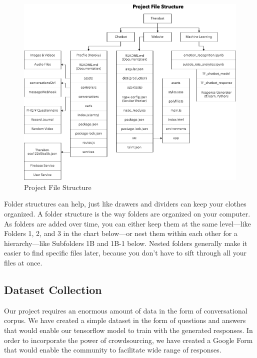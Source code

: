 \begin{figure}[H]
    \centering
    \includegraphics[width=12cm]{images/project-file-structure.png}
    \caption{Project File Structure}
\end{figure}

Folder structures can help, just like drawers and dividers can keep your clothes organized. A folder structure is the way folders are organized on your computer. As folders are added over time, you can either keep them at the same level—like Folders 1, 2, and 3 in the chart below—or nest them within each other for a hierarchy—like Subfolders 1B and 1B-1 below. Nested folders generally make it easier to find specific files later, because you don’t have to sift through all your files at once.

\pagebreak

\subsection{Dataset Collection}

Our project requires an enormous amount of data in the form of conversational corpus. We have created a simple dataset in the form of questions and answers that would enable our tensorflow model to train with the generated responses. In order to incorporate the power of crowdsourcing, we have created a Google Form that would enable the community to facilitate wide range of responses.

